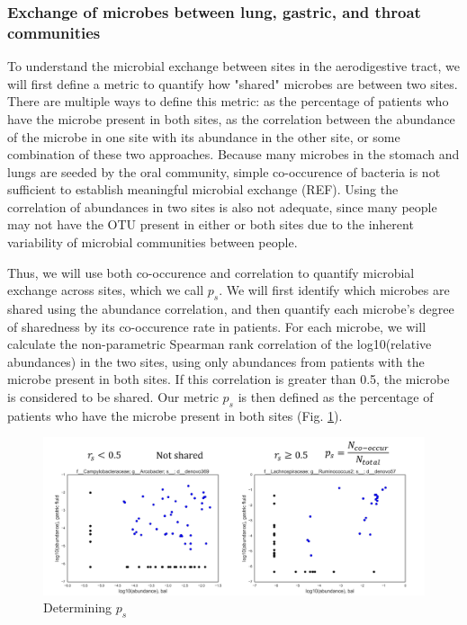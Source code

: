 \documentclass[12pt]{article}
\begin{document}
\subsubsection{Exchange of microbes between lung, gastric, and throat communities} \label{sec:exchange}
To understand the microbial exchange between sites in the aerodigestive tract, we will first define a metric to quantify how "shared" microbes are between two sites. There are multiple ways to define this metric: as the percentage of patients who have the microbe present in both sites, as the correlation between the abundance of the microbe in one site with its abundance in the other site, or some combination of these two approaches. Because many microbes in the stomach and lungs are seeded by the oral community, simple co-occurence of bacteria is not sufficient to establish meaningful microbial exchange (REF). Using the correlation of abundances in two sites is also not adequate, since many people may not have the OTU present in either or both sites due to the inherent variability of microbial communities between people.

Thus, we will use both co-occurence and correlation to quantify microbial exchange across sites, which we call $p_s$. We will first identify which microbes are shared using the abundance correlation, and then quantify each microbe's degree of sharedness by its co-occurence rate in patients. For each microbe, we will calculate the non-parametric Spearman rank correlation of the log10(relative abundances) in the two sites, using only abundances from patients with the microbe present in both sites. If this correlation is greater than 0.5, the microbe is considered to be shared. Our metric $p_s$ is then defined as the percentage of patients who have the microbe present in both sites (Fig. \ref{fig:sharedness_defn}).

\begin{figure}
	\centering
    \includegraphics[scale=0.5]{sharedness_definition}
    \caption{Determining $p_s$}\label{fig:sharedness_defn}
\end{figure}
\end{document}
